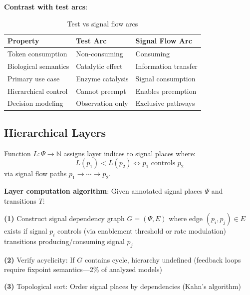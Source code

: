 \vspace{3pt}
\noindent\textbf{Contrast with test arcs}:

\begin{table}[h]
\caption{Test vs signal flow arcs}
\centering
\small
\begin{tabular}{@{}p{}p{}p{}@{}}
\toprule
\textbf{Property} & \textbf{Test Arc} & \textbf{Signal Flow Arc} \\
\midrule
Token consumption & Non-consuming & Consuming \\
Biological semantics & Catalytic effect & Information transfer \\
Primary use case & Enzyme catalysis & Signal consumption \\
Hierarchical control & Cannot preempt & Enables preemption \\
Decision modeling & Observation only & Exclusive pathways \\
\bottomrule
\end{tabular}
\end{table}

\vspace{3pt}
\subsection{Hierarchical Layers}

\begin{definition}
Function $L: \Psi \to \mathbb{N}$ assigns layer indices to signal places where:
\[
L(p_1) < L(p_2) \iff p_1 \text{ controls } p_2
\]
via signal flow paths $p_1 \to \cdots \to p_2$.
\end{definition}

\vspace{3pt}
\noindent\textbf{Layer computation algorithm}: Given annotated signal places $\Psi$ and transitions $T$:

\vspace{2pt}
\noindent\textbf{(1)} Construct signal dependency graph $G = (\Psi, E)$ where edge $(p_i, p_j) \in E$ exists if signal $p_i$ controls (via enablement threshold or rate modulation) transitions producing/consuming signal $p_j$

\vspace{2pt}
\noindent\textbf{(2)} Verify acyclicity: If $G$ contains cycle, hierarchy undefined (feedback loops require fixpoint semantics---2\% of analyzed models)

\vspace{2pt}
\noindent\textbf{(3)} Topological sort: Order signal places by dependencies (Kahn's algorithm)

